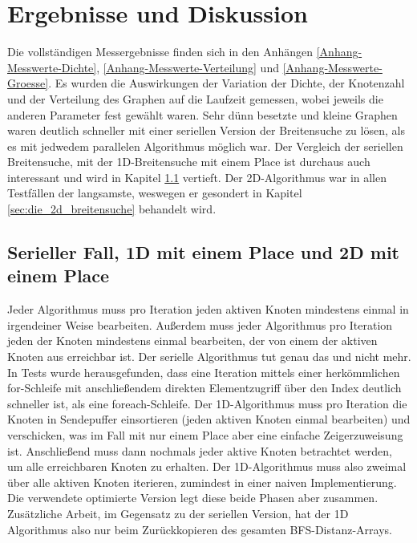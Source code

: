 \chapter{Ergebnisse und Diskussion} %
\label{cha:ergebnisse_und_diskussion}

Die vollständigen Messergebnisse finden sich in den Anhängen \ref{Anhang-Messwerte-Dichte}, \ref{Anhang-Messwerte-Verteilung} und \ref{Anhang-Messwerte-Groesse}. Es wurden die Auswirkungen der Variation der Dichte, der Knotenzahl und der Verteilung des Graphen auf die Laufzeit gemessen, wobei jeweils die anderen Parameter fest gewählt waren. Sehr dünn besetzte und kleine Graphen waren deutlich schneller mit einer seriellen Version der Breitensuche zu lösen, als es mit jedwedem parallelen Algorithmus möglich war. Der Vergleich der seriellen Breitensuche, mit der 1D-Breitensuche mit einem Place ist durchaus auch interessant und wird in Kapitel \ref{sec:serieller_fall_vs_1d_mit_einem_place} vertieft. Der 2D-Algorithmus war in allen Testfällen der langsamste, weswegen er gesondert in Kapitel \ref{sec:die_2d_breitensuche} behandelt wird.

\section{Serieller Fall, 1D mit einem Place und 2D mit einem Place} %
\label{sec:serieller_fall_vs_1d_mit_einem_place}
Jeder Algorithmus muss pro Iteration jeden aktiven Knoten mindestens einmal in irgendeiner Weise bearbeiten. Außerdem muss jeder Algorithmus pro Iteration jeden der Knoten mindestens einmal bearbeiten, der von einem der aktiven Knoten aus erreichbar ist. Der serielle Algorithmus tut genau das und nicht mehr. In Tests wurde herausgefunden, dass eine Iteration mittels einer herkömmlichen for-Schleife mit anschließendem direkten Elementzugriff über den Index deutlich schneller ist, als eine foreach-Schleife. Der 1D-Algorithmus muss pro Iteration die Knoten in Sendepuffer einsortieren (jeden aktiven Knoten einmal bearbeiten) und verschicken, was im Fall mit nur einem Place aber eine einfache Zeigerzuweisung ist. Anschließend muss dann nochmals jeder aktive Knoten betrachtet werden, um alle erreichbaren Knoten zu erhalten. Der 1D-Algorithmus muss also zweimal über alle aktiven Knoten iterieren, zumindest in einer naiven Implementierung. Die verwendete optimierte Version legt diese beide Phasen aber zusammen. Zusätzliche Arbeit, im Gegensatz zu der seriellen Version, hat der 1D Algorithmus also nur beim Zurückkopieren des gesamten BFS-Distanz-Arrays.

